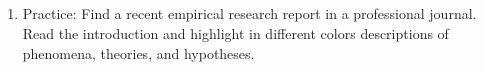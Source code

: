 \subsection{}

\begin{fullwidth}

\begin{enumerate}

\item Practice: Find a recent empirical research report in a professional journal. Read the introduction and highlight in different colors descriptions of phenomena, theories, and hypotheses.

\end{enumerate}

\end{fullwidth}  



